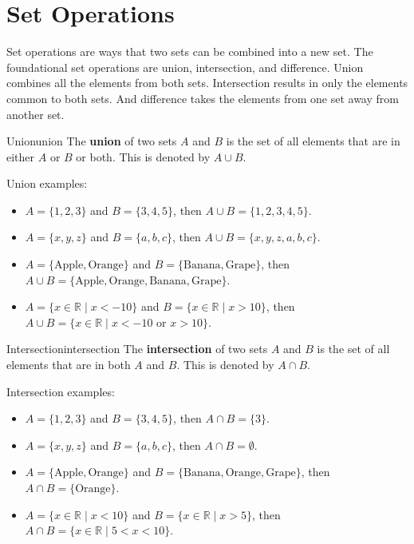 \section{Set Operations}

Set operations are ways that two sets can be combined into a new set. The 
foundational set operations are union, intersection, and difference. Union 
combines all the elements from both sets. Intersection results in only the
elements common to both sets. And difference takes the elements from one
set away from another set.

\begin{definition}{Union}{union}
  The \textbf{union} of two sets \( A \) and \( B \) is the set of all elements 
  that are in either \( A \) or \( B \) or both. This is denoted by \( A \cup B \).
\end{definition}

Union examples:
\begin{itemize}
  \item \( A = \{ 1, 2, 3 \} \) and \( B = \{ 3, 4, 5 \} \), then \( A \cup B = \{ 1, 2, 3, 4, 5 \} \).
  \item \( A = \{ x, y, z \} \) and \( B = \{ a, b, c \} \), then \( A \cup B = \{ x, y, z, a, b, c \} \).
  \item \( A = \{ \text{Apple}, \text{Orange} \} \) and \( B = \{ \text{Banana}, \text{Grape} \} \), then
  \( A \cup B = \{ \text{Apple}, \text{Orange}, \text{Banana}, \text{Grape} \} \).
  \item \( A = \{ x \in \mathbb{R} \mid x < -10 \} \) and \( B = \{ x \in \mathbb{R} \mid x > 10 \} \), then
  \( A \cup B = \{ x \in \mathbb{R} \mid x < -10 \text{ or } x > 10 \} \).
\end{itemize}

\begin{definition}{Intersection}{intersection}
  The \textbf{intersection} of two sets \( A \) and \( B \) is the set of all 
  elements that are in both \( A \) and \( B \). This is denoted by \( A \cap B \).
\end{definition}

Intersection examples:
\begin{itemize}
  \item \( A = \{ 1, 2, 3 \} \) and \( B = \{ 3, 4, 5 \} \), then \( A \cap B = \{ 3 \} \).
  \item \( A = \{ x, y, z \} \) and \( B = \{ a, b, c \} \), then \( A \cap B = \emptyset \).
  \item \( A = \{ \text{Apple}, \text{Orange} \} \) and \( B = \{ \text{Banana}, \text{Orange}, \text{Grape} \} \), then
  \( A \cap B = \{ \text{Orange} \} \).
  \item \( A = \{ x \in \mathbb{R} \mid x < 10 \} \) and \( B = \{ x \in \mathbb{R} \mid x > 5 \} \), then
  \( A \cap B = \{ x \in \mathbb{R} \mid 5 < x < 10 \} \).
\end{itemize}


